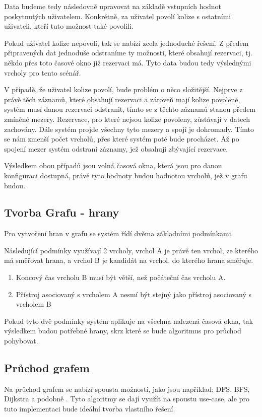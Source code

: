 Data budeme tedy následovně upravovat na základě vstupních hodnot poskytnutých uživatelem. Konkrétně, za uživatel povolí kolize s ostatními uživateli, kteří tuto možnost také povolili.

Pokud uživatel kolize nepovolí, tak se nabízí zcela jednoduché řešení. Z předem připravených dat jednoduše odstraníme ty možnosti, které obsahují rezervaci, tj. někdo přes toto časové okno již rezervaci má. Tyto data budou tedy výslednými vrcholy pro tento scénář.

V případě, že uživatel kolize povolí, bude problém o něco složitější. Nejprve z právě těch záznamů, které obsahují rezervaci a zároveň mají kolize povolené, systém musí danou rezervaci odstranit, tímto se z těchto záznamů stanou předem zmíněné mezery. Rezervace, pro které nejsou kolize povoleny, zůstávají v datech zachovány. Dále systém projde všechny tyto mezery a spojí je dohromady.
Tímto se nám zmenší počet vrcholů, přes které systém poté bude procházet. Až po spojení mezer systém odstraní záznamy, jež obsahují zbývající rezervace.

Výsledkem obou případů jsou volná časová okna, která jsou pro danou konfiguraci dostupná, právě tyto hodnoty budou hodnotou vrcholů, jež v grafu budou.

\subsection{Tvorba Grafu - hrany}
Pro vytvoření hran v grafu se systém řídí dvěma základními podmínkami.

Následující podmínky využívají 2 vrcholy, vrchol A je právě ten vrchol, ze kterého má směřovat hrana, a vrchol B je kandidát na vrchol, do kterého hrana směřuje.
\begin{enumerate}
    \item Koncový čas vrcholu B musí být větší, než počáteční čas vrcholu A.
    \item Přístroj asociovaný s vrcholem A nesmí být stejný jako přístroj asociovaný s vrcholem B
\end{enumerate}

Pokud tyto dvě podmínky systém aplikuje na všechna nalezená časová okna, tak výsledkem budou potřebné hrany, skrz které se bude algoritmus pro průchod pohybovat.


\subsection{Průchod grafem}
Na průchod grafem se nabízí spousta možností, jako jsou například: DFS, BFS, Dijkstra a podobně \cite{tarjan1972depth, bundy1984breadth, javaid2013understanding}. Tyto algoritmy se dají využít na spoustu use-case, ale pro tuto implementaci bude ideální tvorba vlastního řešení.

